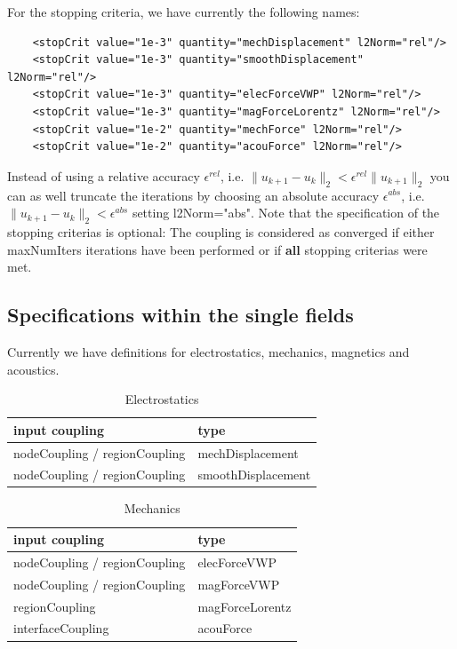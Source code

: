 \noindent
For the stopping criteria, we have currently the following names:

\begin{verbatim}
    <stopCrit value="1e-3" quantity="mechDisplacement" l2Norm="rel"/>
    <stopCrit value="1e-3" quantity="smoothDisplacement" l2Norm="rel"/>
    <stopCrit value="1e-3" quantity="elecForceVWP" l2Norm="rel"/>
    <stopCrit value="1e-3" quantity="magForceLorentz" l2Norm="rel"/>
    <stopCrit value="1e-2" quantity="mechForce" l2Norm="rel"/>
    <stopCrit value="1e-2" quantity="acouForce" l2Norm="rel"/>

\end{verbatim}
Instead of using a relative accuracy $\epsilon^{rel}$, i.e. $\|u_{k+1}-u_k\|_2 < \epsilon^{rel} \|u_{k+1}\|_2$ you can as well
truncate the iterations by choosing an absolute accuracy $\epsilon^{abs}$, i.e. $\|u_{k+1}-u_k\|_2 < \epsilon^{abs}$ setting {\sf
l2Norm="abs"}. Note that the specification of the stopping criterias
is optional: The coupling is considered as converged if either {\sf
  maxNumIters} iterations have been performed or if {\bf all} stopping
criterias were met.


\subsection{Specifications within the single fields}
Currently we have definitions for electrostatics, mechanics, magnetics and acoustics.

\begin{table}[htb]
\begin{center}
\caption{Electrostatics}
\bigskip
\begin{tabular}{l|l}
input coupling & type \\\hline \hline
nodeCoupling / regionCoupling & mechDisplacement \\
nodeCoupling / regionCoupling & smoothDisplacement 
\end{tabular}
\end{center}
\end{table}

\begin{table}[htb]
\begin{center}
\caption{Mechanics}
\bigskip
\begin{tabular}{l|l}
input coupling    & type \\\hline \hline
nodeCoupling / regionCoupling     & elecForceVWP \\
nodeCoupling / regionCoupling    & magForceVWP \\
regionCoupling    & magForceLorentz \\
interfaceCoupling & acouForce 
\end{tabular}
\end{center}
\end{table}

